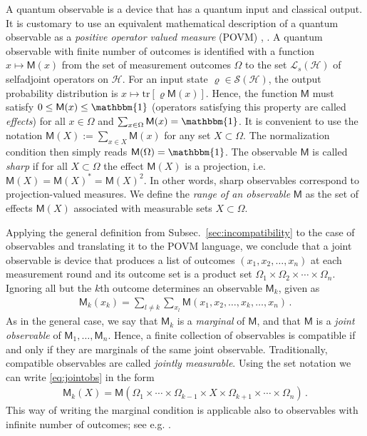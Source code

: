 \documentclass[12pt]{article}
\theoremstyle{definition}
\newcommand{\hi}{\mathcal{H}} %
\newcommand{\lsh}{\mathcal{L}_s(\hi)} %
\newcommand{\sh}{\mathcal{S(H)}} %
\newcommand{\tr}[1]{\textrm{tr}\left[#1\right]} %
\newcommand{\id}{\mathbbm{1}} %
\newcommand{\Mo}{\mathsf{M}}%
\begin{document}
A quantum observable is a device that has a quantum input and classical output.
It is customary to use an equivalent mathematical description of a quantum observable as a \emph{positive operator valued measure} (POVM) \cite{OQP97}, \cite{MLQT12}.
A quantum observable with finite number of outcomes is identified with a function $x\mapsto \Mo(x)$ from the set of measurement outcomes $\Omega$ to the set $\lsh$ of selfadjoint operators on $\hi$.
For an input state $\varrho\in\sh$, the output probability distribution is $x \mapsto \tr{\varrho\Mo(x)}$.
Hence, the function $\Mo$ must satisfy $0\leq\Mo(x)\leq\id$ 
(operators satisfying this property are called \emph{effects}) 
for all $x\in\Omega$ and $\sum_{x\in\Omega} \Mo(x) = \id$. 
It is convenient to use the notation $\Mo(X) := \sum_{x\in X} \Mo(x)$ for any set $X\subset\Omega$.
The normalization condition then simply reads $\Mo(\Omega)=\id$. 
The observable $\Mo$ is called \emph{sharp} if for all $X\subset\Omega$ 
the effect $\Mo(X)$ is a projection, i.e. $\Mo(X)=\Mo(X)^*=\Mo(X)^2$. 
In other words, sharp observables correspond to projection-valued measures. 
We define the \emph{range of an observable} $\Mo$ as the set of effects $\Mo(X)$
associated with measurable sets $X\subset\Omega$.

Applying the general definition from Subsec.~\ref{sec:incompatibility} to the case of observables and translating it to the POVM language, we conclude that a joint observable is device that produces a list of outcomes $(x_1,x_2,\ldots,x_n)$ at each measurement round and its outcome set is a product set $\Omega_1\times\Omega_2\times\cdots\times\Omega_n$.
Ignoring all but the $k$th outcome determines an observable $\Mo_k$, given as
\begin{align}\label{eq:jointobs}
\Mo_k(x_k) = \sum_{l \neq k}\sum_{x_l} \Mo(x_1,x_2,\ldots,x_k,\ldots,x_n) \, .
\end{align}
As in the general case, we say that $\Mo_k$ is a \emph{marginal} of $\Mo$, and that $\Mo$ is a \emph{joint observable} of $\Mo_1,\ldots,\Mo_n$.
Hence, a finite collection of observables is compatible if and only if they are marginals of the same joint observable.
Traditionally, compatible observables are called \emph{jointly measurable}.
Using the set notation we can write \eqref{eq:jointobs} in the form
\begin{align}\label{eq:jointobs2}
\Mo_k(X) = \Mo(\Omega_1 \times \cdots \times \Omega_{k-1} \times X \times \Omega_{k+1} \times\cdots\times\Omega_n ) \, .
\end{align}
This way of writing the marginal condition is applicable also to observables with infinite number of outcomes; see e.g. \cite{LaYl04}. 
\end{document}
